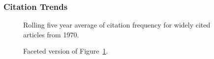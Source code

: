 \documentclass[
  10pt,
  letterpaper,
  DIV=11,
  numbers=noendperiod,
  twoside]{scrartcl}
\begin{document}
\subsubsection*{Citation Trends}\label{sec-trends-1970}

\begin{figure}


\caption{\label{fig-citation-spaghetti-1970}Rolling five year average of
citation frequency for widely cited articles from 1970.}

\end{figure}%

\begin{figure}


\caption{\label{fig-citation-facet-1970}Faceted version of
Figure~\ref{fig-citation-spaghetti-1970}.}

\end{figure}%
\end{document}

